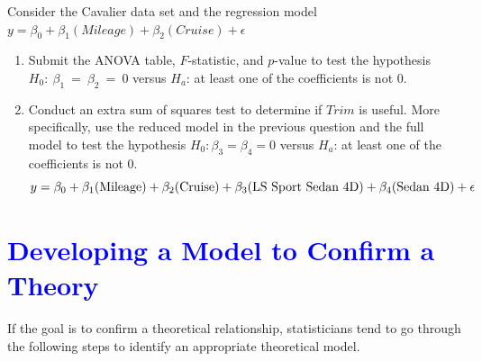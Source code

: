 \documentclass[
]{report}
\begin{document}
Consider the Cavalier data set and the regression model \(\scriptstyle y = \beta_0 + \beta_1(Mileage) + \beta_2(Cruise) + \epsilon\)

\begin{enumerate}
\def\labelenumi{\arabic{enumi}.}
\setcounter{enumi}{29}
\item
  Submit the ANOVA table, \(\scriptstyle F\)-statistic, and \(\scriptstyle p\)-value to test the hypothesis \(\scriptstyle H_0:\  \beta_1 \ =\  \beta_2 \ =\  0\) versus \(\scriptstyle H_a\): at least one of the coefficients is not 0.
\item
  Conduct an extra sum of squares test to determine if \(\scriptstyle Trim\) is useful. More specifically, use the reduced model in the previous question and the full model to test the hypothesis \(\scriptstyle H_0: \beta_3 = \beta_4 = 0\) versus \(\scriptstyle H_a\): at least one of the coefficients is not 0.
  \begin{equation}
  y = \beta_0 + \beta_1(\text{Mileage}) + \beta_2(\text{Cruise}) + \beta_3(\text{LS Sport Sedan 4D}) + \beta_4(\text{Sedan 4D}) + \epsilon \notag
  \end{equation}
\end{enumerate}

\hypertarget{section-35}{%
\section{\texorpdfstring{\textcolor{blue}{Developing a Model to Confirm a Theory}}{}}\label{section-35}}

If the goal is to confirm a theoretical relationship, statisticians tend to go through the following steps to identify an appropriate theoretical model.
\end{document}
